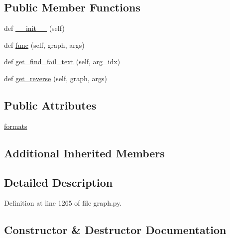 \subsection*{Public Member Functions}
\begin{DoxyCompactItemize}
\item 
def \hyperlink{classlight__chats_1_1graph_1_1PutObjectInFunction_aaf12273d36c38e856cd7dd10bbb90c83}{\+\_\+\+\_\+init\+\_\+\+\_\+} (self)
\item 
def \hyperlink{classlight__chats_1_1graph_1_1PutObjectInFunction_a9f97c240b7308feca19fe4adb63a64f3}{func} (self, graph, args)
\item 
def \hyperlink{classlight__chats_1_1graph_1_1PutObjectInFunction_a634d7e2b36ebdc9b626e32811fabca00}{get\+\_\+find\+\_\+fail\+\_\+text} (self, arg\+\_\+idx)
\item 
def \hyperlink{classlight__chats_1_1graph_1_1PutObjectInFunction_a2e1c568fb874c53d06f12f0fc4349713}{get\+\_\+reverse} (self, graph, args)
\end{DoxyCompactItemize}
\subsection*{Public Attributes}
\begin{DoxyCompactItemize}
\item 
\hyperlink{classlight__chats_1_1graph_1_1PutObjectInFunction_ad244ff0f442d2c6b785022457e330040}{formats}
\end{DoxyCompactItemize}
\subsection*{Additional Inherited Members}


\subsection{Detailed Description}
\begin{DoxyVerb}\end{DoxyVerb}
 

Definition at line 1265 of file graph.\+py.



\subsection{Constructor \& Destructor Documentation}
\mbox{\label{classlight__chats_1_1graph_1_1PutObjectInFunction_aaf12273d36c38e856cd7dd10bbb90c83}} 
